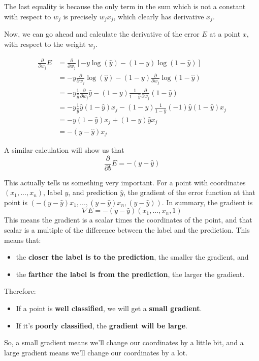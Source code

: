 The last equality is because the only term in the sum which is not a constant with respect to \(w_j\) is precisely \(w_j x_j\), which clearly has derivative \(x_j\). \newline

Now, we can go ahead and calculate the derivative of the error \(E\) at a point \(x\), with respect to the weight \(w_j\).

\[
\begin{split}
    \frac{\partial}{\partial w_j} E &= \frac{\partial}{\partial w_j} {[-y \log(\hat{y}) - {(1-y)} \log(1 - \hat{y})]} \\
    &= -y \frac{\partial}{\partial w_j} \log(\hat{y}) - {(1 - y)} \frac{\partial}{\partial w_j} \log(1 - \hat{y}) \\
    &= -y \frac{1}{\hat{y}} \frac{\partial}{\partial w_j}\hat{y} - {(1 - y)} \frac{1}{1 - \hat{y}} \frac{\partial}{\partial w_j} (1 - \hat{y}) \\
    &= -y \frac{1}{\hat{y}} \hat{y} {(1 - \hat{y})}x_j - {(1 - y)} \frac{1}{1 - \hat{y}} {(-1)} \hat{y} {(1 - \hat{y})} x_j \\
    &= -y{(1 - \hat{y})} x_j + {(1 - y)} \hat{y}  x_j \\
    &= -{(y - \hat{y})}x_j
\end{split}
\]

A similar calculation will show us that \[\frac{\partial}{\partial b} E = -(y-\hat{y})\]

This actually tells us something very important. For a point with coordinates \((x_1, ..., x_n)\), label \(y\), and prediction \(\hat{y}\), the gradient of the error function at that point is \((- (y - \hat{y})x_1, ..., (y - \hat{y})x_n, (y - \hat{y}))\). In summary, the gradient is \[\nabla E = -(y-\hat{y})(x_1,…,x_n,1)\]
This means the gradient is a scalar times the coordinates of the point, and that scalar is a multiple of the difference between the label and the prediction. This means that:

\begin{itemize}
    \item the \textbf{closer the label is to the prediction}, the smaller the gradient, and
    \item the \textbf{farther the label is from the prediction}, the larger the gradient.
\end{itemize}
Therefore:

\begin{itemize}
    \item If a point is \textbf{well classified}, we will get a \textbf{small gradient}.
    \item If it’s \textbf{poorly classified}, the \textbf{gradient will be large}.
\end{itemize}
So, a small gradient means we'll change our coordinates by a little bit, and a large gradient means we'll change our coordinates by a lot.

